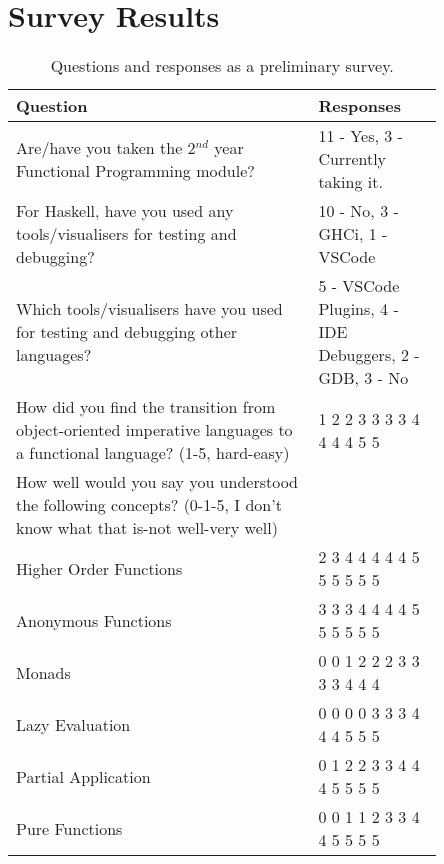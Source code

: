 \section{Survey Results}
\label{survey}

\begin{table}[h]
    \centering
    \begin{tabular}{p{0.6\linewidth}|p{0.25\linewidth}}
        Question & Responses\\\hline
        Are/have you taken the 2$^{nd}$ year Functional Programming module? & 11 - Yes, 3 - Currently taking it.\\\hline
        For Haskell, have you used any tools/visualisers for testing and debugging? & 10 - No, 3 - GHCi, 1 - VSCode\\\hline
        Which tools/visualisers have you used for testing and debugging other languages? & 5 - VSCode Plugins, 4 - IDE Debuggers, 2 - GDB, 3 - No\\\hline
        How did you find the transition from object-oriented imperative languages to a functional language? (1-5, hard-easy) & 1 2 2 3 3 3 3\newline4 4 4 4 4 5 5\\\hline
        How well would you say you understood the following concepts? (0-1-5, I don't know what that is-not well-very well) &\\\hline
        Higher Order Functions &2 3 4 4 4 4 4\newline4 5 5 5 5 5 5\\\hline
        Anonymous Functions &3 3 3 4 4 4 4\newline5 5 5 5 5 5 5\\\hline
        Monads &0 0 1 2 2 2 3\newline3 3 3 3 4 4 4\\\hline
        Lazy Evaluation &0 0 0 0 3 3 3\newline4 4 4 4 5 5 5\\\hline
        Partial Application &0 1 2 2 3 3 4\newline4 4 4 5 5 5 5\\\hline
        Pure Functions &0 0 1 1 2 3 3\newline4 4 4 5 5 5 5\\
    \end{tabular}
    \caption{Questions and responses as a preliminary survey.}
    \label{tab:user-evaluation}
\end{table}

